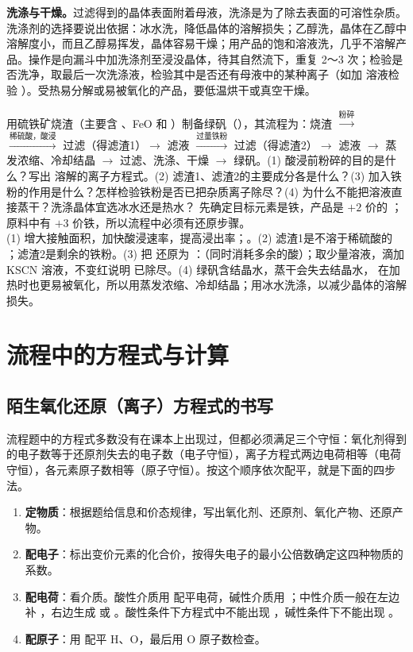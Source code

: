 \textbf{洗涤与干燥。}过滤得到的晶体表面附着母液，洗涤是为了除去表面的可溶性杂质。洗涤剂的选择要说出依据：冰水洗，降低晶体的溶解损失；乙醇洗，晶体在乙醇中溶解度小，而且乙醇易挥发，晶体容易干燥；用产品的饱和溶液洗，几乎不溶解产品。操作是向漏斗中加洗涤剂至浸没晶体，待其自然流下，重复 2～3 次；检验是否洗净，取最后一次洗涤液，检验其中是否还有母液中的某种离子（如加  溶液检验 ）。受热易分解或易被氧化的产品，要低温烘干或真空干燥。

\begin{liti}[基础\quad 原创]
用硫铁矿烧渣（主要含 、FeO 和 ）制备绿矾（），其流程为：烧渣 $\xrightarrow{\text{粉碎}}$ $\xrightarrow{\text{稀硫酸，酸浸}}$ 过滤（得滤渣1）$\to$ 滤液 $\xrightarrow{\text{过量铁粉}}$ 过滤（得滤渣2）$\to$ 滤液 $\to$ 蒸发浓缩、冷却结晶 $\to$ 过滤、洗涤、干燥 $\to$ 绿矾。(1) 酸浸前粉碎的目的是什么？写出  溶解的离子方程式。(2) 滤渣1、滤渣2的主要成分各是什么？(3) 加入铁粉的作用是什么？怎样检验铁粉是否已把杂质离子除尽？(4) 为什么不能把溶液直接蒸干？洗涤晶体宜选冰水还是热水？
\tcblower
\silu 先确定目标元素是铁，产品是 $+2$ 价的 ；原料中有 $+3$ 价铁，所以流程中必须有还原步骤。\\
\jie (1) 增大接触面积，加快酸浸速率，提高浸出率；。(2) 滤渣1是不溶于稀硫酸的 ；滤渣2是剩余的铁粉。(3) 把  还原为 ：（同时消耗多余的酸）；取少量溶液，滴加 KSCN 溶液，不变红说明  已除尽。(4) 绿矾含结晶水，蒸干会失去结晶水， 在加热时也更易被氧化，所以用蒸发浓缩、冷却结晶；用冰水洗涤，以减少晶体的溶解损失。
\end{liti}

\section{流程中的方程式与计算}

\subsection{陌生氧化还原（离子）方程式的书写}
流程题中的方程式多数没有在课本上出现过，但都必须满足三个守恒：氧化剂得到的电子数等于还原剂失去的电子数（电子守恒），离子方程式两边电荷相等（电荷守恒），各元素原子数相等（原子守恒）。按这个顺序依次配平，就是下面的四步法。
\begin{enumerate}
\item \textbf{定物质}：根据题给信息和价态规律，写出氧化剂、还原剂、氧化产物、还原产物。
\item \textbf{配电子}：标出变价元素的化合价，按得失电子的最小公倍数确定这四种物质的系数。
\item \textbf{配电荷}：看介质。酸性介质用  配平电荷，碱性介质用 ；中性介质一般在左边补 ，右边生成  或 。酸性条件下方程式中不能出现 ，碱性条件下不能出现 。
\item \textbf{配原子}：用  配平 H、O，最后用 O 原子数检查。
\end{enumerate}

